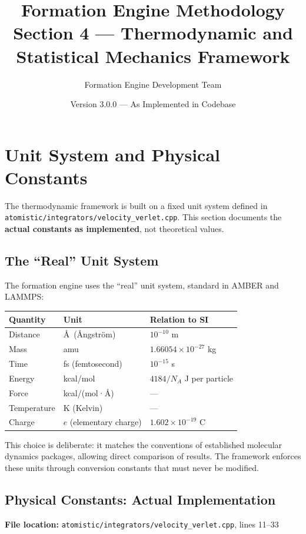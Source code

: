 \documentclass[11pt]{article}
\title{\textbf{Formation Engine Methodology} \\
\Large Section 4 — Thermodynamic and Statistical Mechanics Framework}
\author{Formation Engine Development Team}
\date{Version 3.0.0 — As Implemented in Codebase}
\begin{document}
\maketitle

\section{Unit System and Physical Constants}

The thermodynamic framework is built on a fixed unit system defined in \texttt{atomistic/integrators/velocity\_verlet.cpp}. This section documents the \textbf{actual constants as implemented}, not theoretical values.

\subsection{The ``Real'' Unit System}

The formation engine uses the ``real'' unit system, standard in AMBER and LAMMPS:

\begin{center}
\begin{tabular}{lll}
\toprule
Quantity & Unit & Relation to SI \\
\midrule
Distance & \AA\ (Ångström) & $10^{-10}$ m \\
Mass & amu & $1.66054 \times 10^{-27}$ kg \\
Time & fs (femtosecond) & $10^{-15}$ s \\
Energy & kcal/mol & $4184 / N_A$ J per particle \\
Force & kcal/(mol·\AA) & — \\
Temperature & K (Kelvin) & — \\
Charge & $e$ (elementary charge) & $1.602 \times 10^{-19}$ C \\
\bottomrule
\end{tabular}
\end{center}

This choice is deliberate: it matches the conventions of established molecular dynamics packages, allowing direct comparison of results. The framework enforces these units through conversion constants that must never be modified.

\subsection{Physical Constants: Actual Implementation}

\textbf{File location:} \texttt{atomistic/integrators/velocity\_verlet.cpp}, lines 11--33
\end{document}
